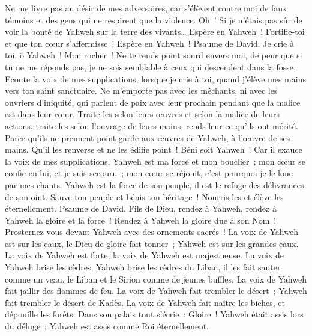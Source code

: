 \begin{multicols}{2}
Ne me livre pas au désir de mes adversaires, car s'élèvent contre moi de faux témoins et des gens qui ne respirent que la violence.
Oh~! Si je n'étais pas sûr de voir la bonté de Yahweh sur la terre des vivants…
Espère en Yahweh~! Fortifie-toi et que ton cœur s'affermisse~! Espère en Yahweh~!
\VerseOne{}Psaume de David. Je crie à toi, ô Yahweh~! Mon rocher~! Ne te rends point sourd envers moi, de peur que si tu ne me réponds pas, je ne sois semblable à ceux qui descendent dans la fosse.
Ecoute la voix de mes supplications, lorsque je crie à toi, quand j'élève mes mains vers ton saint sanctuaire.
Ne m'emporte pas avec les méchants, ni avec les ouvriers d'iniquité, qui parlent de paix avec leur prochain pendant que la malice est dans leur cœur.
Traite-les selon leurs œuvres et selon la malice de leurs actions, traite-les selon l'ouvrage de leurs mains, rends-leur ce qu'ils ont mérité.
Parce qu'ils ne prennent point garde aux œuvres de Yahweh, à l'œuvre de ses mains. Qu'il les renverse et ne les édifie point~!
Béni soit Yahweh~! Car il exauce la voix de mes supplications.
Yahweh est ma force et mon bouclier~; mon cœur se confie en lui, et je suis secouru~; mon cœur se réjouit, c'est pourquoi je le loue par mes chants.
Yahweh est la force de son peuple, il est le refuge des délivrances de son oint.
Sauve ton peuple et bénis ton héritage~! Nourris-les et élève-les éternellement.
\VerseOne{}Psaume de David. Fils de Dieu, rendez à Yahweh, rendez à Yahweh la gloire et la force~!
Rendez à Yahweh la gloire due à son Nom~! Prosternez-vous devant Yahweh avec des ornements sacrés~!
La voix de Yahweh est sur les eaux, le Dieu de gloire fait tonner~; Yahweh est sur les grandes eaux.
La voix de Yahweh est forte, la voix de Yahweh est majestueuse.
La voix de Yahweh brise les cèdres, Yahweh brise les cèdres du Liban,
il les fait sauter comme un veau, le Liban et le Sirion comme de jeunes buffles.
La voix de Yahweh fait jaillir des flammes de feu.
La voix de Yahweh fait trembler le désert~; Yahweh fait trembler le désert de Kadès.
La voix de Yahweh fait naître les biches, et dépouille les forêts. Dans son palais tout s'écrie~: Gloire~!
Yahweh était assis lors du déluge~; Yahweh est assis comme Roi éternellement.

\end{multicols}
